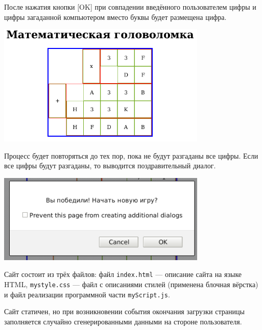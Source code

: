 После нажатия кнопки [OK] при совпадении введённого пользователем цифры и цифры загаданной компьютером вместо буквы будет размещена цифра.

\begin{center} 
  \includegraphics[width = 10cm]{img/image03.png}
\end{center}

Процесс будет повторяться до тех пор, пока не будут разгаданы все цифры. Если все цифры будут разгаданы, то выводится поздравительный диалог.

\begin{center} 
  \includegraphics[width = 10cm]{img/image04.png}
\end{center}

Сайт состоит из трёх файлов: файл \verb|index.html| --- описание сайта на языке HTML, \verb|mystyle.css| --- файл с описаниями стилей (применена блочная вёрстка) и файл реализации программной части \verb|myScript.js|.

Сайт статичен, но при возникновении события окончания загрузки страницы заполняется случайно сгенерированными данными на стороне пользователя.

\pagebreak

